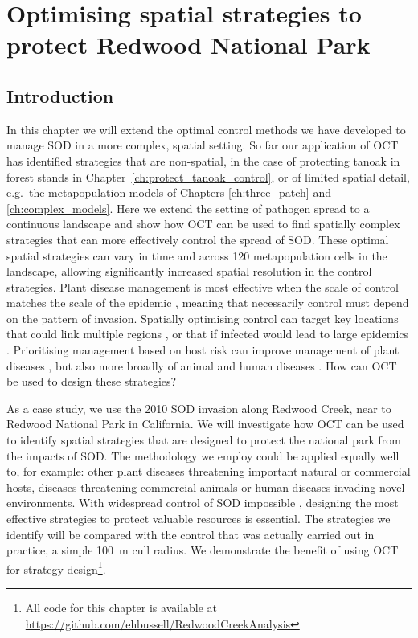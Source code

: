 %

\chapter{Optimising spatial strategies to protect Redwood National Park\label{ch:redwood}}

\section{Introduction}

In this chapter we will extend the optimal control methods we have developed to manage SOD in a more complex, spatial setting. So far our application of OCT has identified strategies that are non-spatial, in the case of protecting tanoak in forest stands in Chapter~\ref{ch:protect_tanoak_control}, or of limited spatial detail, e.g.\ the metapopulation models of Chapters \ref{ch:three_patch} and \ref{ch:complex_models}. Here we extend the setting of pathogen spread to a continuous landscape and show how OCT can be used to find spatially complex strategies that can more effectively control the spread of SOD\@. These optimal spatial strategies can vary in time and across 120 metapopulation cells in the landscape, allowing significantly increased spatial resolution in the control strategies. Plant disease management is most effective when the scale of control matches the scale of the epidemic \citep{gilligan_impact_2007, gilligan_epidemiological_2008, cunniffe_optimising_2015}, meaning that necessarily control must depend on the pattern of invasion. Spatially optimising control can target key locations that could link multiple regions \citep{minor_landscape_2011}, or that if infected would lead to large epidemics \citep{hyatt-twynam_risk-based_2017}. Prioritising management based on host risk can improve management of plant diseases \citep{cunniffe_modelling_2016}, but also more broadly of animal \citep{tildesley_optimal_2006} and human diseases \citep{fraser_factors_2004}. How can OCT be used to design these strategies?

As a case study, we use the 2010 SOD invasion along Redwood Creek, near to Redwood National Park in California. We will investigate how OCT can be used to identify spatial strategies that are designed to protect the national park from the impacts of SOD\@. The methodology we employ could be applied equally well to, for example: other plant diseases threatening important natural or commercial hosts, diseases threatening commercial animals or human diseases invading novel environments. With widespread control of SOD impossible \citep{cunniffe_modelling_2016}, designing the most effective strategies to protect valuable resources is essential. The strategies we identify will be compared with the control that was actually carried out in practice, a simple \SI{100}{\meter} cull radius. We demonstrate the benefit of using OCT for strategy design\footnote{All code for this chapter is available at \url{https://github.com/ehbussell/RedwoodCreekAnalysis}}.

